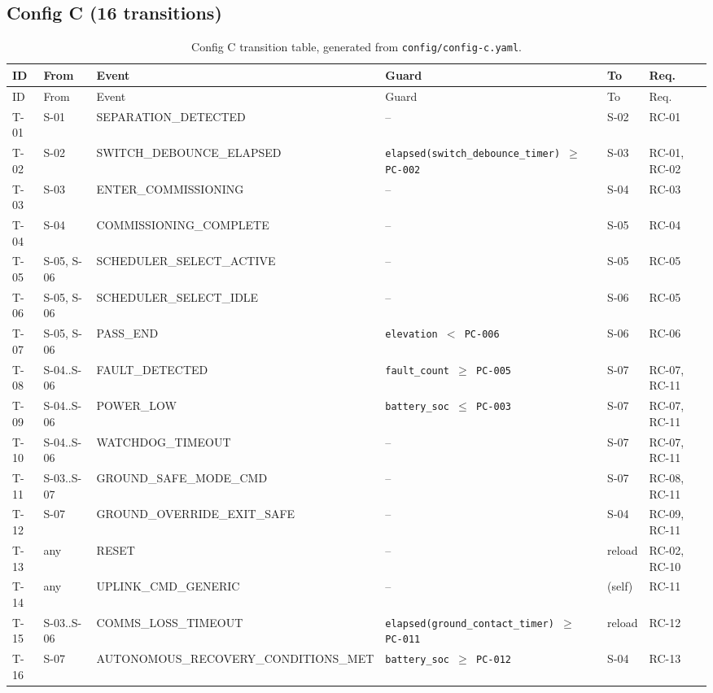 \subsection{Config C (16 transitions)}\label{app:trans-c}
{\scriptsize
\begin{longtable}{@{}p{}p{}p{}p{}p{}p{}@{}}
\caption{Config C transition table, generated from \texttt{config/config-c.yaml}.}\\
\toprule
ID & From & Event & Guard & To & Req. \\
\midrule
\endfirsthead
\toprule
ID & From & Event & Guard & To & Req. \\
\midrule
\endhead
T-01 & S-01 & SEPARATION\_\allowbreak DETECTED & -- & S-02 & \mbox{RC-01} \\
T-02 & S-02 & SWITCH\_\allowbreak DEBOUNCE\_\allowbreak ELAPSED & \texttt{elapsed(switch\_\allowbreak debounce\_\allowbreak timer) $\geq$ PC-002} & S-03 & \mbox{RC-01}, \mbox{RC-02} \\
T-03 & S-03 & ENTER\_\allowbreak COMMISSIONING & -- & S-04 & \mbox{RC-03} \\
T-04 & S-04 & COMMISSIONING\_\allowbreak COMPLETE & -- & S-05 & \mbox{RC-04} \\
T-05 & S-05, S-06 & SCHEDULER\_\allowbreak SELECT\_\allowbreak ACTIVE & -- & S-05 & \mbox{RC-05} \\
T-06 & S-05, S-06 & SCHEDULER\_\allowbreak SELECT\_\allowbreak IDLE & -- & S-06 & \mbox{RC-05} \\
T-07 & S-05, S-06 & PASS\_\allowbreak END & \texttt{elevation $<$ PC-006} & S-06 & \mbox{RC-06} \\
T-08 & S-04..S-06 & FAULT\_\allowbreak DETECTED & \texttt{fault\_\allowbreak count $\geq$ PC-005} & S-07 & \mbox{RC-07}, \mbox{RC-11} \\
T-09 & S-04..S-06 & POWER\_\allowbreak LOW & \texttt{battery\_\allowbreak soc $\leq$ PC-003} & S-07 & \mbox{RC-07}, \mbox{RC-11} \\
T-10 & S-04..S-06 & WATCHDOG\_\allowbreak TIMEOUT & -- & S-07 & \mbox{RC-07}, \mbox{RC-11} \\
T-11 & S-03..S-07 & GROUND\_\allowbreak SAFE\_\allowbreak MODE\_\allowbreak CMD & -- & S-07 & \mbox{RC-08}, \mbox{RC-11} \\
T-12 & S-07 & GROUND\_\allowbreak OVERRIDE\_\allowbreak EXIT\_\allowbreak SAFE & -- & S-04 & \mbox{RC-09}, \mbox{RC-11} \\
T-13 & any & RESET & -- & reload & \mbox{RC-02}, \mbox{RC-10} \\
T-14 & any & UPLINK\_\allowbreak CMD\_\allowbreak GENERIC & -- & (self) & \mbox{RC-11} \\
T-15 & S-03..S-06 & COMMS\_\allowbreak LOSS\_\allowbreak TIMEOUT & \texttt{elapsed(ground\_\allowbreak contact\_\allowbreak timer) $\geq$ PC-011} & reload & \mbox{RC-12} \\
T-16 & S-07 & AUTONOMOUS\_\allowbreak RECOVERY\_\allowbreak CONDITIONS\_\allowbreak MET & \texttt{battery\_\allowbreak soc $\geq$ PC-012} & S-04 & \mbox{RC-13} \\
\bottomrule
\end{longtable}}
